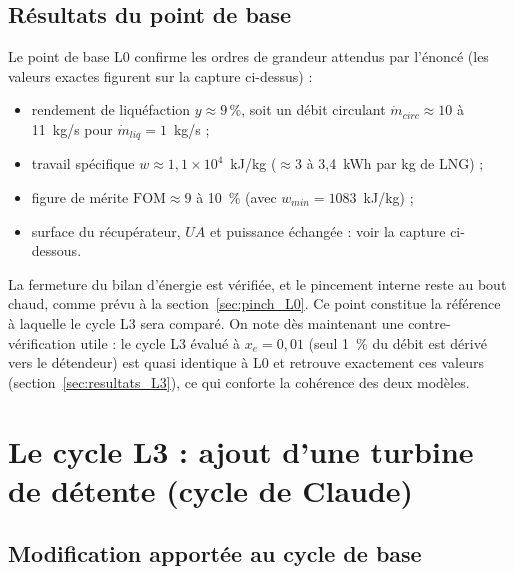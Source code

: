 \subsection{Résultats du point de base}
\label{sec:resultats_L0}


Le point de base L0 confirme les ordres de grandeur attendus par l'énoncé
(les valeurs exactes figurent sur la capture ci-dessus) :
\begin{itemize}
  \item rendement de liquéfaction $y \approx 9\,\%$, soit un débit circulant
        $\dot m_{circ} \approx 10$ à 11~kg/s pour $\dot m_{liq} = 1$~kg/s ;
  \item travail spécifique $w \approx 1{,}1 \times 10^{4}$~kJ/kg
        ($\approx 3$ à 3{,}4~kWh par kg de LNG) ;
  \item figure de mérite $\mathrm{FOM} \approx 9$ à 10~\% (avec
        $w_{min} = 1083$~kJ/kg) ;
  \item surface du récupérateur, $UA$ et puissance échangée : voir la capture
        ci-dessous.
\end{itemize}
La fermeture du bilan d'énergie est vérifiée, et le pincement interne reste
au bout chaud, comme prévu à la section~\ref{sec:pinch_L0}. Ce point
constitue la référence à laquelle le cycle L3 sera comparé. On note dès
maintenant une contre-vérification utile : le cycle L3 évalué à
$x_e = 0{,}01$ (seul 1~\% du débit est dérivé vers le détendeur) est quasi
identique à L0 et retrouve exactement ces valeurs
(section~\ref{sec:resultats_L3}), ce qui conforte la cohérence des deux
modèles.

\section{Le cycle L3 : ajout d'une turbine de détente (cycle de Claude)}

\subsection{Modification apportée au cycle de base}

